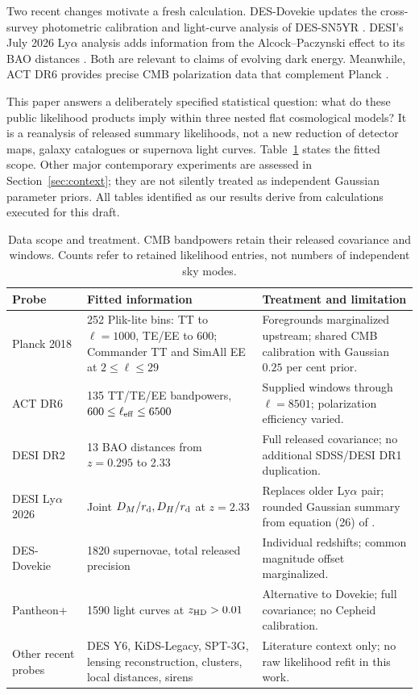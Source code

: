 \documentclass[fleqn,usenatbib]{mnras}
\newcommand{\rd}{r_{\rm d}}
\begin{document}
Two recent changes motivate a fresh calculation. DES-Dovekie updates the
cross-survey photometric calibration and light-curve analysis of DES-SN5YR
\citep{Dovekie}. DESI's July 2026 Ly$\alpha$ analysis adds information from the
Alcock--Paczynski effect to its BAO distances \citep{DESI2026}. Both are relevant
to claims of evolving dark energy. Meanwhile, ACT DR6 provides precise CMB
polarization data that complement Planck \citep{ACT2025,ACTextended}.

This paper answers a deliberately specified statistical question: what do these
public likelihood products imply within three nested flat cosmological models?
It is a reanalysis of released summary likelihoods, not a new reduction of
detector maps, galaxy catalogues or supernova light curves. Table~\ref{tab:data}
states the fitted scope. Other major contemporary experiments are assessed in
Section~\ref{sec:context}; they are not silently treated as independent Gaussian
parameter priors. All tables identified as our results derive from calculations
executed for this draft.

\begin{table}
\centering
\caption{Data scope and treatment. CMB bandpowers retain their released covariance and windows. Counts refer to retained likelihood entries, not numbers of independent sky modes.}
\label{tab:data}
\begin{tabular}{p{}p{}p{}}
\toprule
Probe & Fitted information & Treatment and limitation\\
\midrule
Planck 2018 & 252 Plik-lite bins: TT to $\ell=1000$, TE/EE to 600; Commander TT and SimAll EE at $2\leq\ell\leq29$ & Foregrounds marginalized upstream; shared CMB calibration with Gaussian $0.25$ per cent prior.\\
ACT DR6 & 135 TT/TE/EE bandpowers, $600\leq\ell_{\rm eff}\leq6500$ & Supplied windows through $\ell=8501$; polarization efficiency varied.\\
DESI DR2 & 13 BAO distances from $z=0.295$ to 2.33 & Full released covariance; no additional SDSS/DESI DR1 duplication.\\
DESI Ly$\alpha$ 2026 & Joint $D_M/\rd,D_H/\rd$ at $z=2.33$ & Replaces older Ly$\alpha$ pair; rounded Gaussian summary from equation (26) of \citet{DESI2026}.\\
DES-Dovekie & 1820 supernovae, total released precision & Individual redshifts; common magnitude offset marginalized.\\
Pantheon+ & 1590 light curves at $z_{\rm HD}>0.01$ & Alternative to Dovekie; full covariance; no Cepheid calibration.\\
Other recent probes & DES Y6, KiDS-Legacy, SPT-3G, lensing reconstruction, clusters, local distances, sirens & Literature context only; no raw likelihood refit in this work.\\
\bottomrule
\end{tabular}
\end{table}
\end{document}
